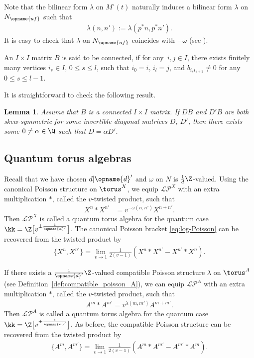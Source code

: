 \documentclass[pdftex]{sigma}
\newcommand{\Mc}{M^\circ}
\newcommand{\Nufv}{N_{\opname{uf}}}
\newcommand{\LP}{{\mathcal{LP}}}
\renewcommand{\diag}{\opname{d}'}
\numberwithin{equation}{section}
\newtheorem{Lemma}[Theorem]{Lemma}
\begin{document}
Note that the bilinear form $\lambda$ on $\Mc(t)$ naturally induces
a bilinear form $\lambda$ on $\Nufv$ such that
\begin{gather*}
\lambda(n,n') :=\lambda(p^{*}n,p^{*}n').
\end{gather*}
It is easy to check that $\lambda$ on $\Nufv$ coincides with $-\omega$
(see \cite[Lemma 2.1.11\,(2)]{qin2020dual}).

\begin{Definition}\label{def:connected_matrix}
An $I\times I$ matrix $B$ is said to be connected, if for any~$i,j\in I$,
there exists finitely many vertices $i_{s}\in I$, $0\leq s\leq l$,
such that $i_{0}=i$, $i_{l}=j$, and $b_{i_{s}i_{s+1}}\neq0$ for
any $0\leq s\leq l-1$.
\end{Definition}

It is straightforward to check the following result.

\begin{Lemma}\label{lem:connected_symmetrizer}
Assume that $B$ is a connected $I\times I$ matrix. If $DB$
and $D'B$ are both skew-symmetric for some invertible diagonal matrices
$D$, $D'$, then there exists some $0\neq\alpha\in\Q$ such that
$D=\alpha D'$.
\end{Lemma}

\subsection{Quantum torus algebras}\label{sec:quantization}

Recall that we have chosen $d|\diag$ and $\omega$ on $N$ is $\frac{1}{d}\Z$-valued. Using the
canonical Poisson structure on $\torus^{X}$, we equip $\LP^{X}$ with an extra multiplication $*$, called the $v$-twisted product, such
that
\begin{align*}
X^{n}*X^{n'} & =v^{-\omega(n,n')}X^{n+n'}.
\end{align*}
Then $\LP^{X}$ is called a quantum torus algebra for the quantum case $\kk=\Z\big[v^{\pm\frac{1}{\diag}}\big]$. The canonical Poisson bracket
\eqref{eq:log-Poisson} can be recovered from the twisted product
by
\begin{align*}
\bigl\{X^{n},X^{n'}\bigr\} =\lim_{v\rightarrow1}\frac{1}{2(v-1)}(X^{n}*X^{n'}-X^{n'}*X^{n}).
\end{align*}

If there exists a $\frac{1}{\diag}\Z$-valued compatible Poisson structure
$\lambda$ on $\torus^{A}$ (see Definition~\ref{def:compatible_poisson_A}), we can equip $\LP^{A}$ with an extra multiplication $*$, called the $v$-twisted product, such that
\begin{align*}
 A^{m}*A^{m'} =v^{\lambda(m,m')}A^{m+m'}.
 \end{align*}
Then $\LP^{A}$ is called a quantum torus algebra for the quantum case $\kk=\Z\big[v^{\pm\frac{1}{\diag}}\big]$. As before, the compatible Poisson structure can be recovered from the twisted product
by
\begin{align*}
\bigl\{A^{m},A^{m'}\bigr\} =\lim_{v\rightarrow1}\frac{1}{2(v-1)}(A^{m}*A^{m'}-A^{m'}*A^{m}).
\end{align*}
\end{document}
